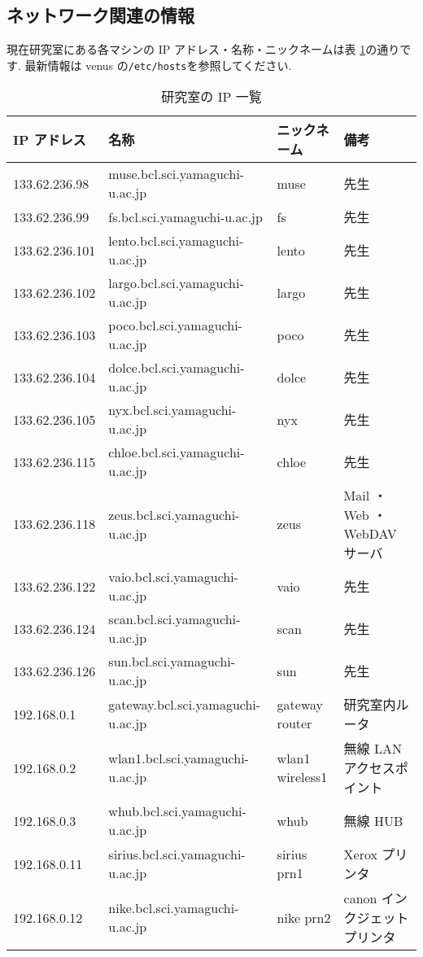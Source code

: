 \documentclass{jarticle}
\begin{document}
\subsection{ネットワーク関連の情報}

現在研究室にある各マシンの IP アドレス・名称・ニックネームは表
\ref{tab:IP}の通りです.
最新情報は venus の\verb|/etc/hosts|を参照してください.
{\small
\begin{table}[tbp]
\centering
\caption{研究室の IP 一覧 } \label{tab:IP}
\begin{tabular}[t]{llll}\hline
IP アドレス &	名称 &					ニックネーム &
備考 \\ \hline
133.62.236.98 &	muse.bcl.sci.yamaguchi-u.ac.jp &	muse & 先生\\ 
133.62.236.99 &	fs.bcl.sci.yamaguchi-u.ac.jp &	fs & 先生\\ 
133.62.236.101 &lento.bcl.sci.yamaguchi-u.ac.jp&	lento & 先生\\ 
133.62.236.102 &largo.bcl.sci.yamaguchi-u.ac.jp &	largo & 先生\\ 
133.62.236.103 &poco.bcl.sci.yamaguchi-u.ac.jp &	poco & 先生\\ 
133.62.236.104 &dolce.bcl.sci.yamaguchi-u.ac.jp &	dolce & 先生\\ 
133.62.236.105 &nyx.bcl.sci.yamaguchi-u.ac.jp   &       nyx & 先生\\
133.62.236.115 &chloe.bcl.sci.yamaguchi-u.ac.jp &	chloe & 先生\\ 
133.62.236.118 &zeus.bcl.sci.yamaguchi-u.ac.jp &	zeus & Mail ・ Web ・ WebDAV サーバ\\ 
133.62.236.122 &vaio.bcl.sci.yamaguchi-u.ac.jp &	vaio & 先生\\ 
133.62.236.124 &scan.bcl.sci.yamaguchi-u.ac.jp &	scan & 先生\\ 
133.62.236.126 &sun.bcl.sci.yamaguchi-u.ac.jp &		sun & 先生\\ 
\hline
192.168.0.1 &	gateway.bcl.sci.yamaguchi-u.ac.jp &	gateway router & 研究室内ルータ\\ 
192.168.0.2 &	wlan1.bcl.sci.yamaguchi-u.ac.jp &	wlan1 wireless1 & 無線 LAN アクセスポイント\\
192.168.0.3 &	whub.bcl.sci.yamaguchi-u.ac.jp &	whub & 無線 HUB\\
192.168.0.11 &	sirius.bcl.sci.yamaguchi-u.ac.jp &	sirius prn1 &	Xerox プリンタ \\
192.168.0.12 &	nike.bcl.sci.yamaguchi-u.ac.jp &	nike prn2 &	canon インクジェットプリンタ \\

\end{tabular}
\end{table}}
\end{document}
